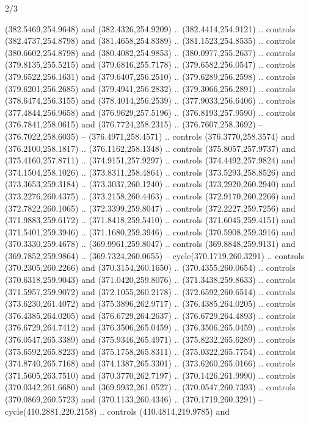 \begin{flagdescription}{2/3}
\begin{scope}[xshift=0.5\flaglength,yshift=0.5\flagwidth,scale=\flagwidth/495.65]
\begin{scope}[y=0.8pt, x=0.8pt, yscale=-1,shift={(-463.76,-309.78)}]
  (382.5469,254.9648) and (382.4326,254.9209) .. (382.4414,254.9121) .. controls
  (382.4737,254.8798) and (381.4658,254.8389) .. (381.1523,254.8535) .. controls
  (380.6602,254.8798) and (380.4082,254.9853) .. (380.0977,255.2637) .. controls
  (379.8135,255.5215) and (379.6816,255.7178) .. (379.6582,256.0547) .. controls
  (379.6522,256.1631) and (379.6407,256.2510) .. (379.6289,256.2598) .. controls
  (379.6201,256.2685) and (379.4941,256.2832) .. (379.3066,256.2891) .. controls
  (378.6474,256.3155) and (378.4014,256.2539) .. (377.9033,256.6406) .. controls
  (377.4844,256.9658) and (376.9629,257.5196) .. (376.8193,257.9590) .. controls
  (376.7841,258.0615) and (376.7724,258.2315) .. (376.7607,258.3692) --
  (376.7022,258.6035) -- (376.4971,258.4571) .. controls (376.3770,258.3574) and
  (376.2100,258.1817) .. (376.1162,258.1348) .. controls (375.8057,257.9737) and
  (375.4160,257.8711) .. (374.9151,257.9297) .. controls (374.4492,257.9824) and
  (374.1504,258.1026) .. (373.8311,258.4864) .. controls (373.5293,258.8526) and
  (373.3653,259.3184) .. (373.3037,260.1240) .. controls (373.2920,260.2940) and
  (373.2276,260.4375) .. (373.2158,260.4463) .. controls (372.9170,260.2266) and
  (372.7822,260.1065) .. (372.3399,259.8047) .. controls (372.2227,259.7256) and
  (371.9883,259.6172) .. (371.8418,259.5410) .. controls (371.6045,259.4151) and
  (371.5401,259.3946) .. (371.1680,259.3946) .. controls (370.5908,259.3916) and
  (370.3330,259.4678) .. (369.9961,259.8047) .. controls (369.8848,259.9131) and
  (369.7852,259.9864) .. (369.7324,260.0655) -- cycle(370.1719,260.3291) ..
  controls (370.2305,260.2266) and (370.3154,260.1650) .. (370.4355,260.0654) ..
  controls (370.6318,259.9043) and (371.0420,259.8076) .. (371.3438,259.8633) ..
  controls (371.5957,259.9072) and (372.1055,260.2178) .. (372.6592,260.6514) ..
  controls (373.6230,261.4072) and (375.3896,262.9717) .. (376.4385,264.0205) ..
  controls (376.4385,264.0205) and (376.6729,264.2637) .. (376.6729,264.4893) ..
  controls (376.6729,264.7412) and (376.3506,265.0459) .. (376.3506,265.0459) ..
  controls (376.0547,265.3389) and (375.9346,265.4971) .. (375.8232,265.6289) ..
  controls (375.6592,265.8223) and (375.1758,265.8311) .. (375.0322,265.7754) ..
  controls (374.8740,265.7168) and (374.1387,265.3301) .. (373.6260,265.0166) ..
  controls (371.5605,263.7510) and (370.3770,262.7197) .. (370.1426,261.9990) ..
  controls (370.0342,261.6680) and (369.9932,261.0527) .. (370.0547,260.7393) ..
  controls (370.0869,260.5723) and (370.1133,260.4346) .. (370.1719,260.3291) --
  cycle(410.2881,220.2158) .. controls (410.4814,219.9785) and

\end{scope}
\end{scope}
\end{flagdescription}
